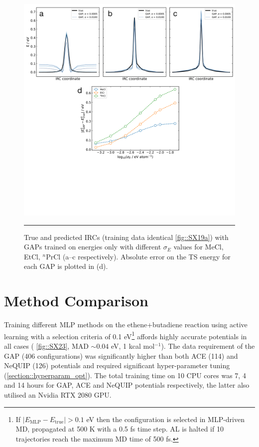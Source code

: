 \documentclass[11pt]{article}
\numberwithin{equation}{subsection}
\newcommand{\kcal}{kcal mol$^{-1}$}
\begin{document}
\begin{figure}[h!]
	\centering
	\includegraphics[width=\textwidth]{figSX19b.pdf}
	\vspace{0.0cm}
	\hrule
	\vspace{0.1cm}
	\caption{True and predicted IRCs (training data identical \figurename{ \ref{fig::SX19a}}) with GAPs trained on energies only with different $\sigma_E$ values for MeCl, EtCl, ${}^n$PrCl  (a--c respectively). Absolute error on the TS  energy for each GAP is plotted in (d).}
	\label{fig::SX19b}
\end{figure}


\clearpage
\section{Method Comparison}  \label{section:SI_mlp_comparison}

Training different MLP methods on the ethene+butadiene reaction using active learning with a selection criteria of 0.1 eV\footnote{If $|E_\text{MLP} - E_\text{true}| > 0.1$ eV then the configuration is selected in MLP-driven MD, propagated at 500 K with a 0.5 fs time step. AL is halted if 10 trajectories reach the maximum MD time of 500 fs.} affords highly accurate potentials in all cases (\figurename{ \ref{fig::SX23}}, MAD $\sim 0.04$ eV, 1 \kcal). The data requirement of the GAP (406 configurations) was significantly higher than both ACE (114) and NeQUIP (126) potentials and required significant hyper-parameter tuning (\ref{section::hyperparam_opt}). The total training time on 10 CPU cores was 7, 4 and 14 hours for GAP, ACE and NeQUIP potentials respectively, the latter also utilised an Nvidia RTX 2080 GPU.
\end{document}
